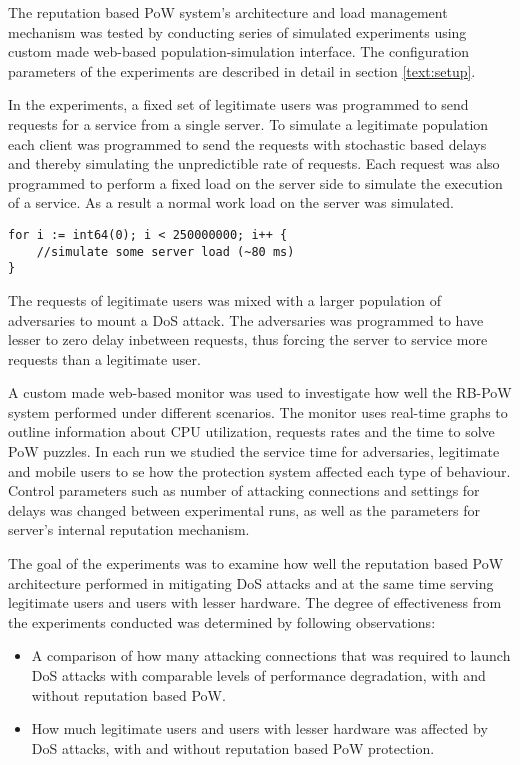 The reputation based PoW system's architecture and load management mechanism was tested by conducting series of simulated experiments using custom made web-based population-simulation interface. The configuration parameters of the experiments are described in detail in section \ref{text:setup}.

In the experiments, a fixed set of legitimate users was programmed to send requests for a service from a single server. To simulate a legitimate population each client was programmed to send the requests with stochastic based delays and thereby simulating the unpredictible rate of requests. Each request was also programmed to perform a fixed load on the server side to simulate the execution of a service. As a result a normal work load on the server was simulated. 
\begin{verbatim}	
for i := int64(0); i < 250000000; i++ {
	//simulate some server load (~80 ms)
}
\end{verbatim}
The requests of legitimate users was mixed with a larger population of adversaries to mount a DoS attack. The adversaries was programmed to have lesser to zero delay inbetween requests, thus forcing the server to service more requests than a legitimate user. 

A custom made web-based monitor was used to investigate how well the RB-PoW system performed under different scenarios. The monitor uses real-time graphs to outline information about CPU utilization, requests rates and the time to solve PoW puzzles. In each run we studied the service time for adversaries, legitimate and mobile users to se how the protection system affected each type of behaviour. Control parameters such as number of attacking connections and settings for delays was changed between experimental runs, as well as the parameters for server's internal reputation mechanism.

The goal of the experiments was to examine how well the reputation based PoW architecture performed in mitigating DoS attacks and at the same time serving legitimate users and users with lesser hardware. The degree of effectiveness from the experiments conducted was determined by following observations:

\begin{itemize}
\item A comparison of how many attacking connections that was required to launch DoS attacks with comparable levels of performance degradation, with and without reputation based PoW.

\item How much legitimate users and users with lesser hardware was affected by DoS attacks, with and without reputation based PoW protection.
\end{itemize}

